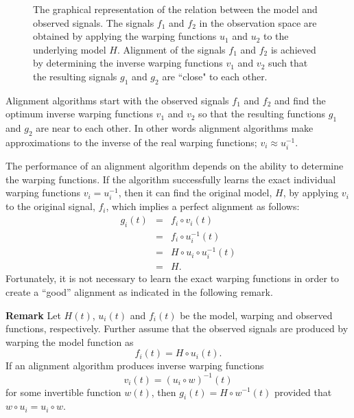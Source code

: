 \documentclass[number,1p,12pt]{elsarticle}
\begin{document}
\begin{figure}
\caption{The graphical representation of the relation between the model and observed signals. The signals $f_1$ and $f_2$ in the observation space are obtained by applying the warping functions $u_1$ and $u_2$ to the underlying model $H$. Alignment of the signals $f_1$ and $f_2$ is achieved by determining the inverse warping functions $v_1$ and $v_2$ such that the resulting signals $g_1$ and $g_2$ are ``close" to each other. }
\label{Figure01}
\end{figure} 

Alignment algorithms start with the observed signals $f_1$ and $f_2$ and find the optimum inverse warping functions $v_1$ and $v_2$ so that the resulting functions $g_1$ and $g_2$ are near to each other. In other words alignment algorithms make approximations to the inverse of the real warping functions; $v_i\approx  u_i^{-1}$. 

The performance of an alignment algorithm depends on the ability to determine the warping functions. If the algorithm successfully learns the exact individual warping functions $v_i = u_i^{-1}$, then it can find the original model, $H$, by applying $v_i$ to the original signal, $f_i$, which implies a perfect alignment as follows:
\begin{eqnarray}
g_i(t) & = & f_i\circ v_i(t)  \nonumber \\
         & = & f_i\circ u_i^{-1}(t) \nonumber \\
         & = & H\circ u_i\circ u_i^{-1} (t) \nonumber \\
         & = & H.
\end{eqnarray}
Fortunately, it is not necessary to learn the exact warping functions in order to create a ``good'' alignment as indicated in the following remark.

{\bf Remark }
Let $H(t)$, $u_i(t)$ and $f_i(t)$ be the model, warping and observed functions, respectively. Further assume that the observed signals are produced by warping the model function as
$$ f_i(t) = H\circ u_i(t).$$ 
If an alignment algorithm produces inverse warping functions 
$$ v_i(t)  = (u_i\circ w)^{-1}(t) $$
for some invertible function $w(t)$, then $g_i(t) = H\circ w^{-1}(t)$ provided that $w\circ u_i=u_i\circ w$.
\end{document}
